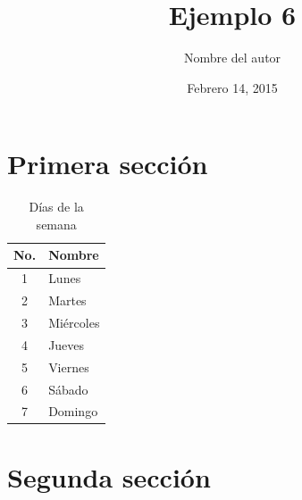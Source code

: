 \documentclass[a4paper,12pt, spanish, twocolumn]{article}
\begin{document}
	\title{Ejemplo 6}
	\author{Nombre del autor}
	\date{Febrero 14, 2015}
	\maketitle
	\begin{abstract}
	\blindtext
	\end{abstract}
	\section{Primera sección}
	\blindtext
	
	\begin{quote}
		\blindtext
	\end{quote}
	\blindtext
	
	\begin{table}[h]
		\centering
		\begin{tabular}{| c || l |}
	    	\hline \hline
	     	No. & Nombre \\
     		\hline \hline
      		1 & Lunes \\
      		2 & Martes \\
	      	3 & Miércoles \\
    	  	4 & Jueves \\
      		5 & Viernes \\
	      	6 & Sábado \\
    	  	7 & Domingo \\
      		\hline
		  \end{tabular}
  		\caption{Días de la semana}
	\end{table}


	\section{Segunda sección}
		\blindtext[1]
\end{document}
